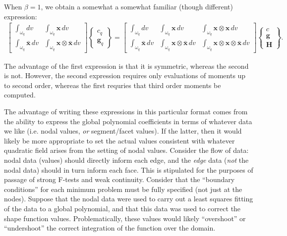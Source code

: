 \documentclass[11pt]{article} %
\begin{document}
When $\beta = 1$, we obtain a somewhat a somewhat familiar (though different) expression:
\begin{eqnarray}
	\left[ \begin{array}{cc} \int_{\omega_q} dv & \int_{\omega_q} \mathbf{x} \, dv \\ \int_{\omega_q} \bar{\mathbf{x}} \, dv & \int_{\omega_q} \mathbf{x} \otimes \bar{\mathbf{x}} \, dv \end{array} \right] \left\{ \begin{array}{c} c_q \\ \mathbf{g}_q \end{array} \right\} =  \left[ \begin{array}{ccc} \int_{\omega_q} dv & \int_{\omega_q} \mathbf{x} \, dv & \int_{\omega_q} \mathbf{x} \otimes \mathbf{x} \, dv \\ \int_{\omega_q} \bar{\mathbf{x}} \, dv & \int_{\omega_q} \mathbf{x} \otimes \bar{\mathbf{x}} \, dv & \int_{\omega_q} \mathbf{x} \otimes \mathbf{x} \otimes \bar{\mathbf{x}} \, dv \end{array} \right] \left\{ \begin{array}{c} c \\ \mathbf{g} \\ \mathbf{H} \end{array} \right\} .
\end{eqnarray}

The advantage of the first expression is that it is symmetric, whereas the second is not. However, the second expression requires only evaluations of moments up to second order, whereas the first requries that third order moments be computed.

The advantage of writing these expressions in this particular format comes from the ability to express the global polynomial coefficients in terms of whatever data we like (i.e. nodal values, \textit{or} segment/facet values). If the latter, then it would likely be more appropriate to set the actual values consistent with whatever quadratic field arises from the setting of nodal values. Consider the flow of data: nodal data (values) should directly inform each edge, and the \textit{edge} data (\textit{not} the nodal data) should in turn inform each face. This is stipulated for the purposes of passage of strong F-tests and weak continuity. Consider that the ``boundary conditions'' for each minimum problem must be fully specified (not just at the nodes). Suppose that the nodal data were used to carry out a least squares fitting of the data to a global polynomial, and that this data was used to correct the shape function values. Problematically, these values would likely ``overshoot'' or ``undershoot'' the correct integration of the function over the domain.
\end{document}
